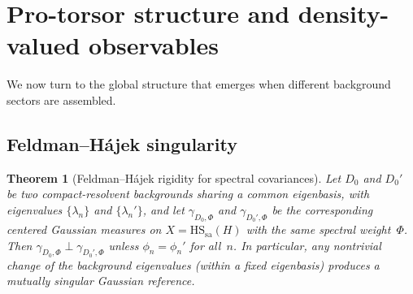 \documentclass[12pt,a4paper]{article}
\theoremstyle{plain}
\newtheorem{theorem}{Theorem}[section]
\theoremstyle{definition}
\theoremstyle{remark}
\newcommand{\HS}{\mathrm{HS}}
\newcommand{\sa}{\mathrm{sa}}
\begin{document}
\section{Pro-torsor structure and density-valued observables}
\label{sec:pro-torsor}

We now turn to the global structure that emerges when different
background sectors are assembled.

\subsection{Feldman--H\'ajek singularity}

\begin{theorem}[Feldman--H\'ajek rigidity for spectral covariances]
\label{thm:feldman-hajek}
Let $D_0$ and $D_0'$ be two compact-resolvent backgrounds
\emph{sharing a common eigenbasis}, with eigenvalues
$\{\lambda_n\}$ and $\{\lambda_n'\}$, and let $\gamma_{D_0,\Phi}$
and $\gamma_{D_0',\Phi}$ be the corresponding centered Gaussian
measures on $X = \HS_\sa(H)$ with the same spectral weight~$\Phi$.
Then $\gamma_{D_0,\Phi} \perp \gamma_{D_0',\Phi}$ unless
$\phi_n = \phi_n'$ for all~$n$.  In particular, any nontrivial
change of the background eigenvalues (within a fixed eigenbasis)
produces a mutually singular Gaussian reference.
\end{theorem}
\end{document}
